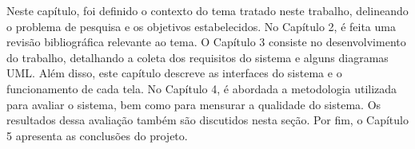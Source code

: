 Neste capítulo, foi definido o contexto do tema tratado neste trabalho, delineando o problema de pesquisa e os objetivos estabelecidos. No Capítulo 2, é feita uma revisão bibliográfica relevante ao tema. O Capítulo 3 consiste no desenvolvimento do trabalho, detalhando a coleta dos requisitos do sistema e alguns diagramas \ac{UML}. Além disso, este capítulo descreve as interfaces do sistema e o funcionamento de cada tela. No Capítulo 4, é abordada a metodologia utilizada para avaliar o sistema, bem como para mensurar a qualidade do sistema. Os resultados dessa avaliação também são discutidos nesta seção. Por fim, o Capítulo 5 apresenta as conclusões do projeto.
